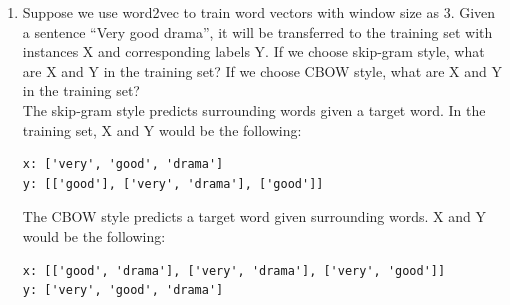 \documentclass[conference]{IEEEtran}
\begin{document}
\begin{enumerate}
\item Suppose we use word2vec to train word vectors with window size as 3. Given a sentence “Very good drama”, it will be transferred to the training set with instances X and corresponding labels Y. If we choose skip-gram style, what are X and Y in the training set? If we choose CBOW style, what are X and Y in the training set?\\

The skip-gram style predicts surrounding words given a target word. In the training set, X and Y would be the following:
\begin{lstlisting}
x: ['very', 'good', 'drama']
y: [['good'], ['very', 'drama'], ['good']]
\end{lstlisting}
The CBOW style predicts a target word given surrounding words. X and Y would be the following:
\begin{lstlisting}
x: [['good', 'drama'], ['very', 'drama'], ['very', 'good']]
y: ['very', 'good', 'drama']
\end{lstlisting}

\end{enumerate}
\newpage
\end{document}
